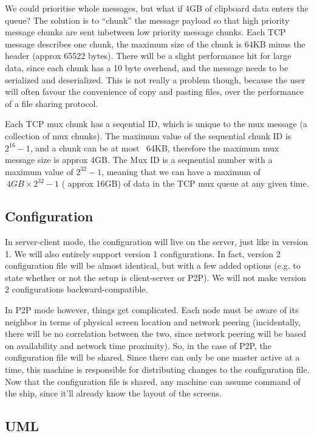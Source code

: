 We could prioritise whole messages, but what if 4GB of clipboard data enters
the queue? The solution is to ``chunk'' the message payload so that high 
priority message chunks are sent inbetween low priority message chunks. Each TCP
message describes one chunk, the maximum size of the chunk is 64KB minus the 
header (approx 65522 bytes). There will be a slight performance hit for large
data, since each chunk has a 10 byte overhead, and the message needs to be 
serialized and deserialized. This is not really a problem though, because the
user will often favour the convenience of copy and pasting files, over the 
performance of a file sharing protocol.

Each TCP mux chunk has a seqential ID, which is unique to the mux message
(a collection of mux chunks). The maximum value of the sequential chunk ID is
$2^{16}-1$, and a chunk can be at most ~64KB, therefore the maximum mux message
size is approx 4GB. The Mux ID is a seqnential number with a maximum value of 
$2^{32}-1$, meaning that we can have a maximum of $~4GB \times 2^{32}-1$ (
approx 16GB) of data in the TCP mux queue at any given time.

\subsection{Configuration}

In server-client mode, the configuration will live on the server, just like in
version 1. We will also entirely support version 1 configurations. In fact, 
version 2 configuration file will be almost identical, but with a few added
options (e.g. to state whether or not the setup is client-server or P2P). We 
will not make version 2 configurations backward-compatible.

In P2P mode however, things get complicated. Each node must be aware of its
neighbor in terms of physical screen location and network peering
(incidentally, there will be no correlation between the two, since network 
peering will be based on availability and network time proximity). So, in the
case of P2P, the configuration file will be shared. Since there can only be
one master active at a time, this machine is responsible for distributing
changes to the configuration file. Now that the configuration file is shared,
any machine can assume command of the ship, since it'll already know the layout
of the screens.

\clearpage
\subsection{UML}

